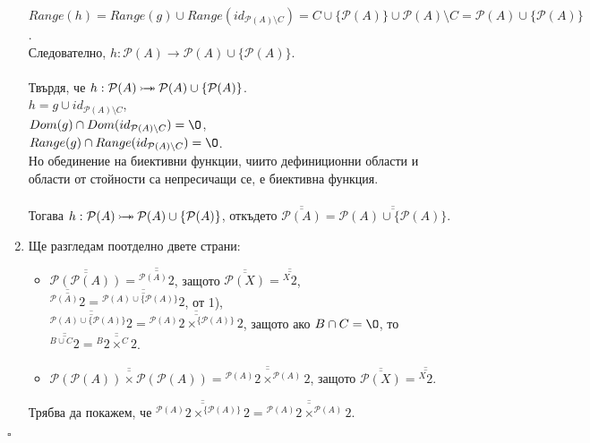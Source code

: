 \documentclass[french]{article}
\begin{document}
\begin{enumerate}
		$Range(h) = Range(g) \cup Range(id_{\mathcal{P}(A) \setminus C}) = C \cup \{{\mathcal{P}(A)}\} \cup \mathcal{P}(A) \setminus C = \mathcal{P}(A) \cup \{\mathcal{P}(A)\}$. \\
		Следователно, $h : \mathcal{P}(A) \to \mathcal{P}(A) \cup \{\mathcal{P}(A)\}$. \\
		\\
		Твърдя, че $h : \mathcal{P}(A) \mathbin{\rightarrowtail \hspace{-8pt} \twoheadrightarrow} \mathcal{P}(A) \cup \{\mathcal{P}(A)\}$. \\
		$h = g \cup id_{\mathcal{P}(A) \setminus C}$, \\
		$Dom(g) \cap Dom(id_{\mathcal{P}(A) \setminus C}) = {\O}$, \\
		$Range(g) \cap Range(id_{\mathcal{P}(A) \setminus C}) = {\O}$. \\
		Но обединение на биективни функции, чиито дефиниционни области и области от стойности са непресичащи се, е биективна функция. \\
		\\
		Тогава  $h : \mathcal{P}(A) \mathbin{\rightarrowtail \hspace{-8pt} \twoheadrightarrow} \mathcal{P}(A) \cup \{\mathcal{P}(A)\}$, откъдето $\overline{\overline{\mathcal{P}(A)}} = \overline{\overline{\mathcal{P}(A) \cup \{\mathcal{P}(A)\}}}$.
	    \item Ще разгледам поотделно двете страни:
	    \begin{itemize}
	    	\item $\overline{\overline{\mathcal{P}(\mathcal{P}(A))}} = \overline{\overline{^{\mathcal{P}(A)}\!2}}$, защото $\overline{\overline{\mathcal{P}(X)}} = \overline{\overline{^X\!2}}$, \\
	    	$\overline{\overline{^{\mathcal{P}(A)}\!2}} = \overline{\overline{^{\mathcal{P}(A) \cup \{\mathcal{P}(A)\}}\!2}}$, от 1), \\
	    	$\overline{\overline{^{\mathcal{P}(A) \cup \{\mathcal{P}(A)\}}\!2}} = \overline{\overline{^{\mathcal{P}(A)}\!2 \times ^{\{\mathcal{P}(A)\}}\!2}}$, защото ако $B \cap C = {\O}$, то $\overline{\overline{^{B \cup C}\!2}} = \overline{\overline{^B\!2 \times ^C\!2}}$.
	    	\item $\overline{\overline{\mathcal{P}(\mathcal{P}(A)) \times \mathcal{P}(\mathcal{P}(A))}} = \overline{\overline{^{\mathcal{P}(A)}\!2 \times ^{\mathcal{P}(A)}\!2}}$, защото $\overline{\overline{\mathcal{P}(X)}} = \overline{\overline{^X\!2}}$.
	    \end{itemize}
	    Трябва да покажем, че $\overline{\overline{^{\mathcal{P}(A)}\!2 \times ^{\{\mathcal{P}(A)\}}\!2}} = \overline{\overline{^{\mathcal{P}(A)}\!2 \times ^{\mathcal{P}(A)}\!2}}$.
	\end{enumerate}
	$\square$
\end{document}
